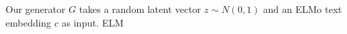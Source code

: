 Our generator $G$ takes a random latent vector $z \sim N(0, 1)$ and an ELMo text embedding $c$ as input. ELM